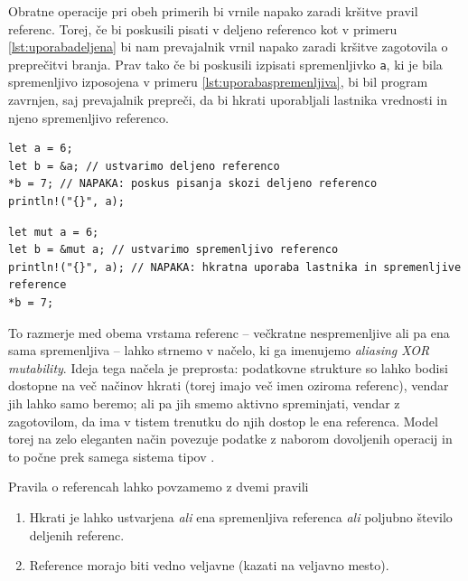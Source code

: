 \documentclass[a4paper,12pt,openright]{book}
\begin{document}
Obratne operacije pri obeh primerih bi vrnile napako zaradi kršitve pravil referenc. Torej, če bi poskusili pisati
v deljeno referenco kot v primeru \ref{lst:uporabadeljena} bi nam prevajalnik vrnil napako zaradi kršitve zagotovila o preprečitvi
branja. Prav tako če bi poskusili izpisati spremenljivko \verb|a|, ki je bila spremenljivo izposojena v primeru \ref{lst:uporabaspremenljiva},
bi bil program zavrnjen, saj prevajalnik prepreči, da bi hkrati uporabljali lastnika vrednosti in njeno spremenljivo referenco.

\begin{listing}[!ht]
	\begin{verbatim}
let a = 6;
let b = &a; // ustvarimo deljeno referenco
*b = 7; // NAPAKA: poskus pisanja skozi deljeno referenco
println!("{}", a);
\end{verbatim}
	\caption{Napačna uporaba deljene reference - poskus pisanja}
	\label{lst:napacanapacnadeljena}
\end{listing}

\begin{listing}[!ht]
	\begin{verbatim}
let mut a = 6;
let b = &mut a; // ustvarimo spremenljivo referenco
println!("{}", a); // NAPAKA: hkratna uporaba lastnika in spremenljive reference
*b = 7;
\end{verbatim}
	\caption{Napačna uporaba spremenljive reference - hkratna uporaba lastnika}
	\label{lst:napacnaspremenljiva}
\end{listing}


To razmerje med obema vrstama referenc -- večkratne nespremenljive ali pa ena sama spremenljiva -- lahko strnemo v načelo, ki ga imenujemo \textit{aliasing XOR mutability}. Ideja tega načela je preprosta: podatkovne strukture so lahko bodisi dostopne na več načinov hkrati (torej imajo več imen oziroma referenc), vendar jih lahko samo beremo; ali pa jih smemo aktivno spreminjati, vendar z zagotovilom, da ima v tistem trenutku do njih dostop le ena referenca. Model torej na zelo eleganten način povezuje podatke z naborom dovoljenih operacij in to počne prek samega sistema tipov \cite{yanovskiGhostCellSeparatingPermissions2021}.

Pravila o referencah lahko povzamemo z dvemi pravili \cite{klabnikRustProgrammingLanguage2023}
\begin{enumerate}
	\item Hkrati je lahko ustvarjena \textit{ali} ena spremenljiva referenca \textit{ali} poljubno število deljenih referenc.
	\item Reference morajo biti vedno veljavne (kazati na veljavno mesto).
\end{enumerate}
\end{document}
